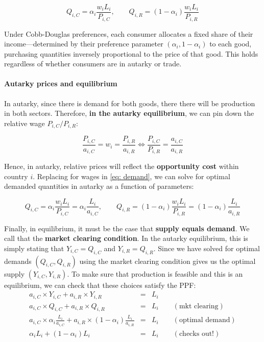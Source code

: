 \documentclass[11pt,letterpaper]{article}
\begin{document}
\begin{equation}\label{eq: demand}
    Q_{i,C} = \alpha_i  \frac{w_i L_i}{P_{i,C}}, \qquad Q_{i,R} = (1-\alpha_i) \frac{w_i L_i}{P_{i,R}}
\end{equation}
\normalsize

Under Cobb-Douglas preferences, each consumer allocates a fixed share of their income—determined by their preference parameter $(\alpha_i, 1-\alpha_i)$ to each good, purchasing quantities inversely proportional to the price of that good. This holds regardless of whether consumers are in autarky or trade. 

\paragraph{Autarky prices and equilibrium} In autarky, since there is demand for both goods, there there will be production in both sectors. Therefore, \textbf{in the autarky equilibrium}, we can pin down the relative wage $P_{i,C} / P_{i,R}$:

\begin{equation}\label{eq: autarky-prices}
            \frac{P_{i,C}}{a_{i,C}} = w_i = \frac{P_{i,R}}{a_{i,R}} \iff \frac{P_{i,C}}{P_{i,R}} = \frac{a_{i,C}}{a_{i,R}}  
\end{equation}

Hence, in autarky, relative prices will reflect the \textbf{opportunity cost} within country $i$. Replacing for wages in \eqref{eq: demand}, we can solve for optimal demanded quantities in autarky as a function of parameters:

\begin{equation}\label{eq: demand-autarky}
    Q_{i,C} = \alpha_i  \frac{w_i L_i}{P_{i,C}} = \alpha_i  \frac{L_i}{a_{i,C}}  , \qquad Q_{i,R} = (1-\alpha_i) \frac{w_i L_i}{P_{i,R}} = (1-\alpha_i) \frac{L_i}{a_{i,R}} 
\end{equation}

Finally, in equilibrium, it must be the case that \textbf{supply equals demand}. We call that the \textbf{market clearing condition}. In the autarky equilibrium, this is simply stating that $Y_{i,C} = Q_{i,C}$ and $Y_{i,R} = Q_{i,R}$. Since we have solved for optimal demands $( Q_{i,C}, Q_{i,R})$ using the market clearing condition gives us the optimal supply $(Y_{i,C}, Y_{i,R})$. To make sure that production is feasible and this is an equilibrium, we can check that these choices satisfy the PPF:
\begin{eqnarray*}
    a_{i,C} \times Y_{i,C} + a_{i,R} \times Y_{i,R} &=& L_i \\
    a_{i,C} \times Q_{i,C} + a_{i,R} \times Q_{i,R} &=& L_i \qquad (\text{mkt clearing}) \\
    a_{i,C} \times \alpha_i  \frac{L_i}{a_{i,C}} + a_{i,R} \times (1-\alpha_i) \frac{L_i}{a_{i,R}}  &=& L_i \qquad (\text{optimal demand}) \\
    \alpha_i  L_i + (1-\alpha_i) L_i  &=& L_i \qquad (\text{checks out!})
\end{eqnarray*}
\end{document}
